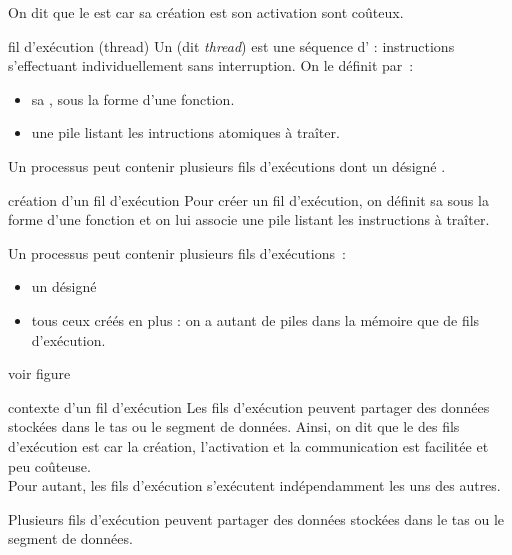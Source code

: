 \begin{adjustwidth}{-3cm}{-3cm}
\begin{remarque}{}{}
    On dit que le  est  car sa création est son activation sont coûteux.
\end{remarque}

\begin{definition}{}{fil d'exécution (thread)}
    Un  (dit \textit{thread}) est une séquence d' : instructions s'effectuant individuellement sans interruption. On le définit par~:
    \begin{itemize}
        \item sa , sous la forme d'une fonction.
        \item une pile listant les intructions atomiques à traîter.
    \end{itemize}
    Un processus peut contenir plusieurs fils d'exécutions dont un désigné .
\end{definition}

\begin{remarque}{}{création d'un fil d'exécution}
    Pour créer un fil d'exécution, on définit sa  sous la forme d'une fonction et on lui associe une pile listant les instructions à traîter.
\end{remarque}

\begin{remarque}{}{}
    Un processus peut contenir plusieurs fils d'exécutions~:
    \begin{itemize}
        \item un désigné 
        \item tous ceux créés en plus : on a autant de piles dans la mémoire que de fils d'exécution.
    \end{itemize}
    voir figure 
\end{remarque}

\begin{remarque}{}{contexte d'un fil d'exécution}
    Les fils d'exécution peuvent partager des données stockées dans le tas ou le segment de données. Ainsi, on dit que le  des fils d'exécution est  car la création, l'activation et la communication est facilitée et peu coûteuse.\\
    Pour autant, les fils d'exécution s'exécutent indépendamment les uns des autres.
\end{remarque}

Plusieurs fils d'exécution peuvent partager des données stockées dans le tas ou le segment de données.


\end{adjustwidth}
